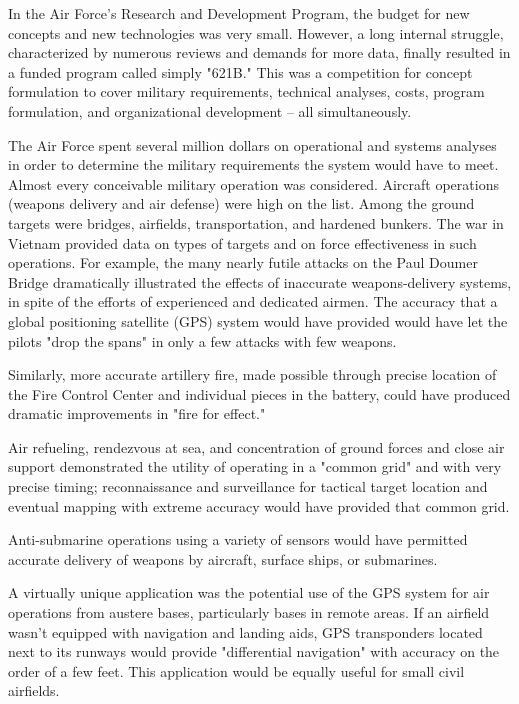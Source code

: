 In the Air Force's Research and Development Program, the budget for new concepts and new technologies was very small. However, a long internal struggle, characterized by numerous reviews and demands for more data, finally resulted in a funded program called simply "621B." This was a competition for concept formulation to cover military requirements, technical analyses, costs, program formulation, and organizational development -- all simultaneously.

The Air Force spent several million dollars on operational and systems analyses in order to determine the military requirements the system would have to meet. Almost every conceivable military operation was considered. Aircraft operations (weapons delivery and air defense) were high on the list. Among the ground targets were bridges, airfields, transportation, and hardened bunkers. The war in Vietnam provided data on types of targets and on force effectiveness in such operations. For example, the many nearly futile attacks on the Paul Doumer Bridge dramatically illustrated the effects of inaccurate weapons-delivery systems, in spite of the efforts of experienced and dedicated airmen. The accuracy that a global positioning satellite (GPS) system would have provided would have let the pilots "drop the spans" in only a few attacks with few weapons.

Similarly, more accurate artillery fire, made possible through precise location of the Fire Control Center and individual pieces in the battery, could have produced dramatic improvements in "fire for effect."

Air refueling, rendezvous at sea, and concentration of ground forces and close air support demonstrated the utility of operating in a "common grid" and with very precise timing; reconnaissance and surveillance for tactical target location and eventual mapping with extreme accuracy would have provided that common grid.

Anti-submarine operations using a variety of sensors would have permitted accurate delivery of weapons by aircraft, surface ships, or submarines.

A virtually unique application was the potential use of the GPS system for air operations from austere bases, particularly bases in remote areas. If an airfield wasn't equipped with navigation and landing aids, GPS transponders located next to its runways would provide "differential navigation" with accuracy on the order of a few feet. This application would be equally useful for small civil airfields.

